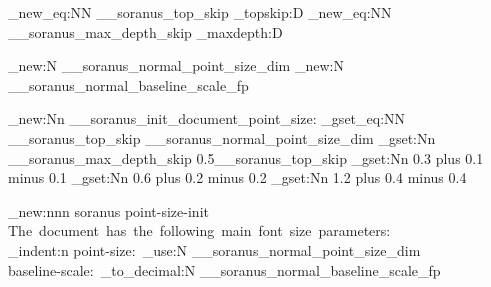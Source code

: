 %
%
%
% 
%

%

%

\cs_new_eq:NN \g__soranus_top_skip \tex_topskip:D
\cs_new_eq:NN \g__soranus_max_depth_skip \tex_maxdepth:D

\dim_new:N \g__soranus_normal_point_size_dim
\fp_new:N \g__soranus_normal_baseline_scale_fp


%

\cs_new:Nn \__soranus_init_document_point_size:
  {
    \dim_gset_eq:NN \g__soranus_top_skip \g__soranus_normal_point_size_dim
    \dim_gset:Nn \g__soranus_max_depth_skip {0.5\g__soranus_top_skip}
    \skip_gset:Nn \smallskipamount
      {
         {0.3}
        plus  {0.1}
        minus  {0.1}
      }
    \skip_gset:Nn \medskipamount
      {
         {0.6}
        plus  {0.2}
        minus  {0.2}
      }
    \skip_gset:Nn \bigskipamount
      {
         {1.2}
        plus  {0.4}
        minus  {0.4}
      }
  }


%

\msg_new:nnn {soranus} {point-size-init}
  {
    The~document~has~the~following~main~font~size~parameters:\\
    \iow_indent:n
      {
        point-size:~\dim_use:N \g__soranus_normal_point_size_dim\\
        baseline-scale:~\fp_to_decimal:N \g__soranus_normal_baseline_scale_fp
      }
  }

